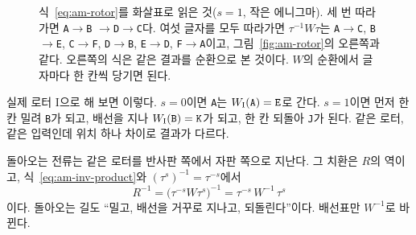 \begin{figure}[ht]
\centering
{}
\caption{식~\eqref{eq:am-rotor}를 화살표로 읽은 것($s=1$, 작은 에니그마). 세 번 따라가면 \texttt{A}$\to$\texttt{B}%
$\to$\texttt{D}$\to$\texttt{C}다. 여섯 글자를 모두 따라가면 $\tau^{-1}W\tau$는 \texttt{A}$\to$\texttt{C},
\texttt{B}$\to$\texttt{E}, \texttt{C}$\to$\texttt{F}, \texttt{D}$\to$\texttt{B}, \texttt{E}$\to$\texttt{D},
\texttt{F}$\to$\texttt{A}이고, 그림~\ref{fig:am-rotor}의 오른쪽과 같다. 오른쪽의 식은 같은 결과를 순환으로 본 것이다.
$W$의 순환에서 글자마다 한 칸씩 당기면 된다.}
\label{fig:am-conj}
\end{figure}

실제 로터 I으로 해 보면 이렇다. $s=0$이면 \texttt{A}는 $W_{\mathrm{I}}(\mathtt{A}) = \mathtt{E}$로 간다. $s=1$이면 먼저
한 칸 밀려 \texttt{B}가 되고, 배선을 지나 $W_{\mathrm{I}}(\mathtt{B}) = \mathtt{K}$가 되고, 한 칸 되돌아 \texttt{J}가
된다. 같은 로터, 같은 입력인데 위치 하나 차이로 결과가 다르다.

돌아오는 전류는 같은 로터를 반사판 쪽에서 자판 쪽으로 지난다. 그 치환은 $R$의 역이고,
식~\eqref{eq:am-inv-product}와 $(\tau^{s})^{-1} = \tau^{-s}$에서
\begin{equation}
  R^{-1} = \bigl(\tau^{-s}W\tau^{s}\bigr)^{-1} = \tau^{-s}\,W^{-1}\,\tau^{s} \label{eq:am-rotor-inv}
\end{equation}
이다. 돌아오는 길도 ``밀고, 배선을 거꾸로 지나고, 되돌린다''이다. 배선표만 $W^{-1}$로 바뀐다.

